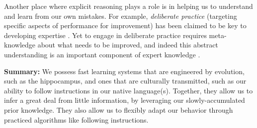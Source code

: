 Another place where explicit reasoning plays a role is in helping us to understand and learn from our own mistakes. For example, \emph{deliberate practice} (targeting specific aspects of performance for improvement) has been claimed to be key to developing expertise \citep{Ericsson1993, Ericsson2017}. Yet to engage in deliberate practice requires meta-knowledge about what needs to be improved, and indeed this abstract understanding is an important component of expert knowledge \citep{Feltovich2012}. \par
\textbf{Summary:} We possess fast learning systems that are engineered by evolution, such as the hippocampus, and ones that are culturally transmitted, such as our ability to follow instructions in our native language(s). Together, they allow us to infer a great deal from little information, by leveraging our slowly-accumulated prior knowledge. They also allow us to flexibly adapt our behavior through practiced algorithms like following instructions. \par 

